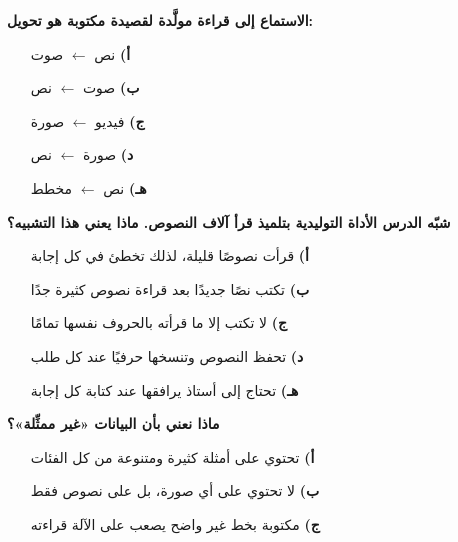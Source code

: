 \documentclass[11pt,a4paper]{article}
\begin{document}
\begin{multicols}{2}
\noindent\begin{minipage}{\linewidth}
\hangindent=0.7cm\textbf{الاستماع إلى قراءة مولَّدة لقصيدة مكتوبة هو تحويل:}
\begin{itemize}[leftmargin=0.95cm, labelsep=4pt, itemsep=0pt, topsep=2pt, parsep=0pt]
  \item[\textbf{أ)}] نص $\leftarrow$ صوت
  \item[\textbf{ب)}] صوت $\leftarrow$ نص
  \item[\textbf{ج)}] فيديو $\leftarrow$ صورة
  \item[\textbf{د)}] صورة $\leftarrow$ نص
  \item[\textbf{هـ)}] نص $\leftarrow$ مخطط
\end{itemize}
\end{minipage}\par\vspace{7pt plus 4pt}
\noindent\begin{minipage}{\linewidth}
\hangindent=0.7cm\textbf{شبّه الدرس الأداة التوليدية بتلميذ قرأ آلاف النصوص. ماذا يعني هذا التشبيه؟}
\begin{itemize}[leftmargin=0.95cm, labelsep=4pt, itemsep=0pt, topsep=2pt, parsep=0pt]
  \item[\textbf{أ)}] قرأت نصوصًا قليلة، لذلك تخطئ في كل إجابة
  \item[\textbf{ب)}] تكتب نصًا جديدًا بعد قراءة نصوص كثيرة جدًا
  \item[\textbf{ج)}] لا تكتب إلا ما قرأته بالحروف نفسها تمامًا
  \item[\textbf{د)}] تحفظ النصوص وتنسخها حرفيًا عند كل طلب
  \item[\textbf{هـ)}] تحتاج إلى أستاذ يرافقها عند كتابة كل إجابة
\end{itemize}
\end{minipage}\par\vspace{7pt plus 4pt}
\noindent\begin{minipage}{\linewidth}
\hangindent=0.7cm\textbf{ماذا نعني بأن البيانات «غير ممثِّلة»؟}
\begin{itemize}[leftmargin=0.95cm, labelsep=4pt, itemsep=0pt, topsep=2pt, parsep=0pt]
  \item[\textbf{أ)}] تحتوي على أمثلة كثيرة ومتنوعة من كل الفئات
  \item[\textbf{ب)}] لا تحتوي على أي صورة، بل على نصوص فقط
  \item[\textbf{ج)}] مكتوبة بخط غير واضح يصعب على الآلة قراءته

\end{itemize}
\end{minipage}
\end{multicols}
\end{document}
